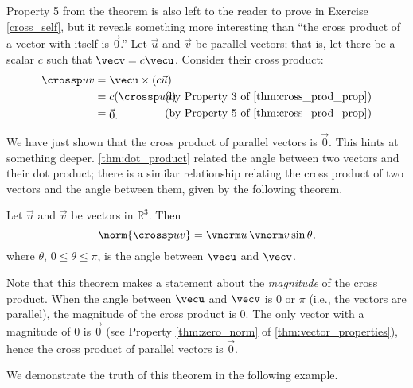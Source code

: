 Property 5 from the theorem is also left to the reader to prove in Exercise \ref{cross_self}, but it reveals something more interesting than ``the cross product of a vector with itself is $\vec 0$.'' Let $\vec u$ and $\vec v$ be parallel vectors; that is, let there be a scalar $c$ such that $\vecv = c\vecu$. Consider their cross product:
\begin{align*}
\crossp uv &= \vecu \times (c\vec u) \\
					&=	\parbox{50pt}{$c(\crossp uu)$}\text{(by Property 3 of \autoref{thm:cross_prod_prop})}\\
					&= \parbox{50pt}{$\vec 0$.}\text{(by Property 5 of \autoref{thm:cross_prod_prop})}
\end{align*}

We have just shown that the cross product of parallel vectors is $\vec 0$. This hints at something deeper. \autoref{thm:dot_product} related the angle between two vectors and their dot product; there is a similar relationship relating the cross product of two vectors and the angle between them, given by the following theorem.

{Let $\vec u$ and $\vec v$ be vectors in $\mathbb{R}^3$. Then
\[\norm{\crossp uv} = \vnorm u\, \vnorm v \sin\theta,\]
where $\theta$, $0\leq \theta \leq \pi$, is the angle between $\vecu$ and $\vecv$.
}


Note that this theorem makes a statement about the \emph{magnitude} of the cross product. When the angle between $\vecu$ and $\vecv$ is 0 or $\pi$ (i.e., the vectors are parallel), the magnitude of the cross product is 0. The only vector with a magnitude of 0 is $\vec 0$ (see Property \ref{thm:zero_norm} of \autoref{thm:vector_properties}), hence the cross product of  parallel vectors is $\vec 0$.\bigskip

We demonstrate the truth of this theorem in the following example.

